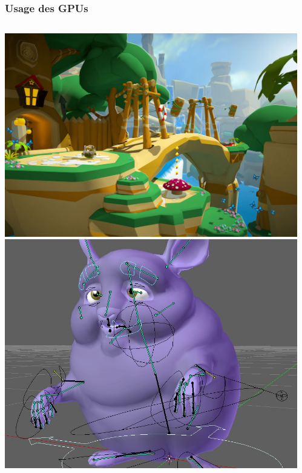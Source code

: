 \begin{frame}
  \frametitle{Usage des GPUs}
  \begin{columns}
    \begin{column}{.2\textwidth}
      \begin{center}
        \includegraphics[width=1.\textwidth]{images/game.jpg} \\[5mm]
        \includegraphics[width=1.\textwidth]{images/blender.jpg}
      \end{center}
    \end{column}
    \begin{column}{.2\textwidth}
      \begin{center}

\end{center}
\end{column}
\end{columns}
\end{frame}
